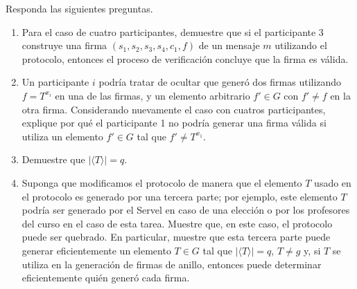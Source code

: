 
\item Responda las siguientes preguntas.
\begin{enumerate}
\item \text{[0.5 puntos]} Para el caso de cuatro participantes, demuestre que si el participante 3 construye una firma
$(s_1, s_2, s_3, s_4, c_1, f)$ de un mensaje $m$ utilizando el protocolo, entonces el proceso
de verificación concluye que la firma es válida.

\item \text{[0.5 puntos]} Un participante $i$ podría tratar de ocultar que generó dos firmas utilizando $f = T^{x_i}$ en una de las
firmas, y un elemento arbitrario $f' \in G$ con $f' \neq f$ en la otra firma. Considerando nuevamente el caso con cuatros
participantes, explique por qué el participante 1 no podría generar una firma válida si utiliza un elemento $f' \in G$
tal que $f' \neq T^{x_1}$.

\item \text{[0.5 puntos]} Demuestre que $|\langle T \rangle| = q$.

\item \text{[0.5 puntos]} Suponga que modificamos el protocolo de manera que el elemento $T$ usado en el protocolo es generado por
una tercera parte; por ejemplo, este elemento $T$ podría ser generado por el Servel en caso de una elección o por los
profesores del curso en el caso de esta tarea. Muestre que, en este caso, el protocolo puede ser quebrado. En particular,
muestre que esta tercera parte puede generar eficientemente un elemento $T \in G$ tal que $|\langle T \rangle| = q$, $T \neq g$
y, si $T$ se utiliza en la generación de firmas de anillo, entonces puede determinar eficientemente quién
generó cada firma.
\end{enumerate}


\medskip

